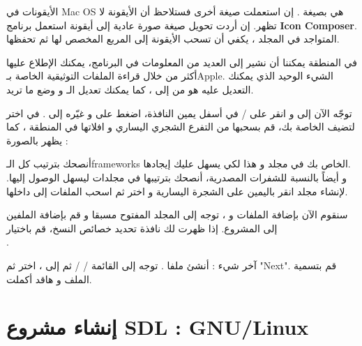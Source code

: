 \begin{information}
الأيقونات في
\textenglish{Mac OS}
هي بصيغة
.
إن استعملت صيغة أخرى فستلاحظ أن الأيقونة لا تظهر. إن أردت تحويل صيغة صورة عادية إلى أيقونة استعمل برنامج 
\textbf{\textenglish{Icon Composer}}.
المتواجد في المجلد
،
يكفي أن تسحب الأيقونة إلى المربع المخصص لها ثم تحفظها.
\end{information}

في المنطقة 
يمكننا أن نشير إلى العديد من المعلومات في البرنامج، يمكنك الإطلاع عليها أكثر من خلال قراءة الملفات التوثيقية الخاصة بـ\textenglish{Apple}.
الشيء الوحيد الذي يمكنك التعديل عليه هو 
من 
إلى 
،
كما يمكنك تعديل الـ
و وضع ما تريد.

توجّه الآن إلى 
و انقر على 
 / 
في أسفل يمين النافذة، اضغط على 
و غيّره إلى 
.
في 
اختر
لتضيف الخاصة بك، قم بسحبها من التفرع الشجري اليساري و افلاتها في المنطقة
،
كما يظهر بالصورة  :


أنصحك بترتيب كل الـ\textenglish{frameworks}
الخاص بك في مجلد 
و هذا لكي يسهل عليك إيجادها.\\
و أيضاً بالنسبة للشفرات المصدرية، أنصحك بترتيبها في مجلدات ليسهل الوصول إليها. لإنشاء مجلد انقر باليمين على الشجرة اليسارية و اختر
ثم اسحب الملفات إلى داخلها.

سنقوم الآن بإضافة الملفات
و 
،
توجه إلى المجلد 
المفتوح مسبقا و قم بإضافة الملفين إلى المشروع. إذا ظهرت لك نافذة تحديد خصائص النسخ، قم باختيار\\
.

آخر شيء : أنشئ ملفا
.
توجه إلى القائمة 
 /  / 
ثم إلى 
، 
اختر
ثم
"\textenglish{Next}".
قم بتسمية الملف و هاقد أكملت.

\section{إنشاء مشروع \textenglish{SDL} :  \textenglish{GNU/Linux}}


